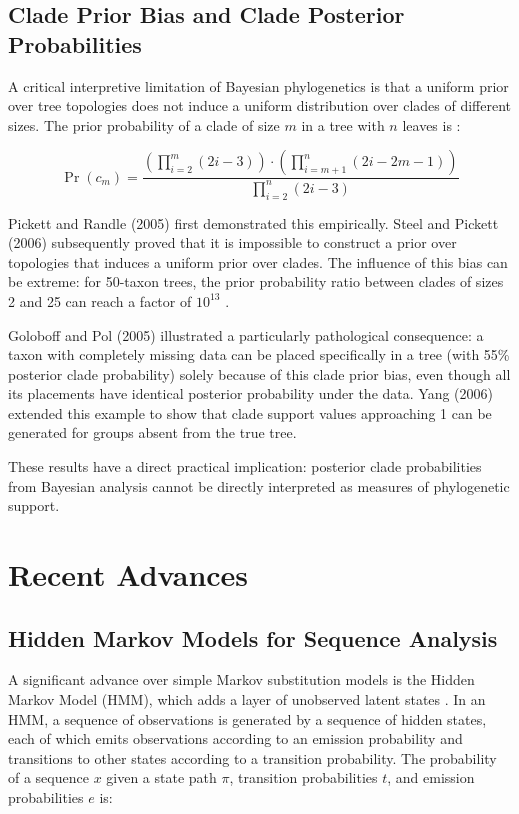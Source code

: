 \subsection{Clade Prior Bias and Clade Posterior Probabilities}

A critical interpretive limitation of Bayesian phylogenetics is that a uniform prior over tree topologies does not induce a uniform distribution over clades of different sizes. The prior probability of a clade of size $m$ in a tree with $n$ leaves is \parencite{wheeler2012}:

$$\Pr(c_m) = \frac{\left(\prod_{i=2}^{m} (2i-3)\right) \cdot \left(\prod_{i=m+1}^{n} (2i-2m-1)\right)}{\prod_{i=2}^{n} (2i-3)}$$

Pickett and Randle (2005) first demonstrated this empirically. Steel and Pickett (2006) subsequently proved that it is impossible to construct a prior over topologies that induces a uniform prior over clades. The influence of this bias can be extreme: for 50-taxon trees, the prior probability ratio between clades of sizes 2 and 25 can reach a factor of $10^{13}$ \parencite{wheeler2012}.

Goloboff and Pol (2005) illustrated a particularly pathological consequence: a taxon with completely missing data can be placed specifically in a tree (with 55\% posterior clade probability) solely because of this clade prior bias, even though all its placements have identical posterior probability under the data. Yang (2006) extended this example to show that clade support values approaching 1 can be generated for groups absent from the true tree.

These results have a direct practical implication: posterior clade probabilities from Bayesian analysis cannot be directly interpreted as measures of phylogenetic support.

\section{Recent Advances}

\subsection{Hidden Markov Models for Sequence Analysis}

A significant advance over simple Markov substitution models is the Hidden Markov Model (HMM), which adds a layer of unobserved latent states \parencite{wheeler2012}. In an HMM, a sequence of observations is generated by a sequence of hidden states, each of which emits observations according to an emission probability and transitions to other states according to a transition probability. The probability of a sequence $x$ given a state path $\pi$, transition probabilities $t$, and emission probabilities $e$ is:

